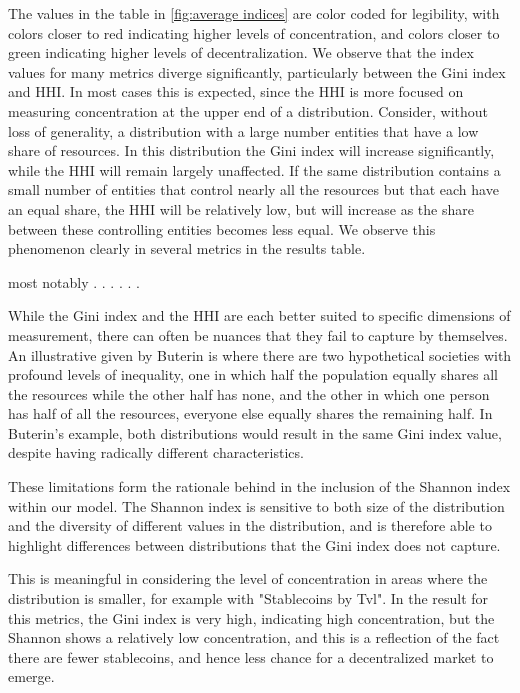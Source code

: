 \documentclass[conference]{IEEEtran}
\begin{document}
The values in the table in \ref{fig:average indices} are color coded for legibility, with colors closer to red indicating higher levels of concentration, and colors closer to green indicating higher levels of decentralization. We observe that the index values for many metrics diverge significantly, particularly between the Gini index and HHI.  In most cases this is expected, since the HHI is more focused on measuring concentration at the upper end of a distribution. Consider, without loss of generality, a distribution with a large number entities that have a low share of resources. In this distribution the Gini index will increase significantly, while the HHI will remain largely unaffected.  If the same distribution contains a small number of entities that control nearly all the resources but that each have an equal share, the HHI will be relatively low, but will increase as the share between these controlling entities becomes less equal.  We observe this phenomenon clearly in several metrics in the results table.

most notably  . . . . . .

While the Gini index and the HHI are each better suited to specific dimensions of measurement, there can often be nuances that they fail to capture by themselves.  An illustrative given by Buterin \cite{buterin2022b} is where there are two hypothetical societies with profound levels of inequality, one in which half the population equally shares all the resources while the other half has none, and the other in which one person has half of all the resources, everyone else equally shares the remaining half.  In Buterin's example, both distributions would result in the same Gini index value, despite having radically different characteristics.

These limitations form the rationale behind in the inclusion of the Shannon index within our model.  The Shannon index is sensitive to both size of the distribution and the diversity of different values in the distribution, and is therefore able to highlight differences between distributions that the Gini index does not capture.

This is meaningful in considering the level of concentration in areas where the distribution is smaller, for example with "Stablecoins by Tvl".  In the result for this metrics, the Gini index is very high, indicating high concentration, but the Shannon shows a relatively low concentration, and this is a reflection of the fact there are fewer stablecoins, and hence less chance for a decentralized market to emerge.
\end{document}
